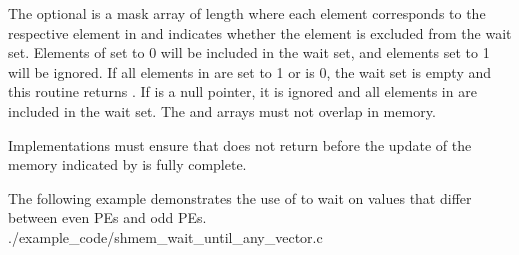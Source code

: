 \begin{apidefinition}
{    The optional  is a mask array of length  where each
    element corresponds to the respective element in  and indicates
    whether the element is excluded from the wait set.  Elements of
     set to 0 will be included in the wait set, and elements set to
    1 will be ignored.  If all elements in  are set to 1 or
     is 0, the wait set is empty and this routine returns
    .  If  is a null pointer, it is ignored and
    all elements in  are included in the wait set.  The 
    and  arrays must not overlap in memory.

    Implementations must ensure that 
    does not return before the update of the memory indicated by  is
    fully complete.
}



\begin{apiexamples}
  \apicexample
      {The following \Cstd[11] example demonstrates the use of
       to wait on values that differ
      between even PEs and odd PEs.}
      {./example_code/shmem_wait_until_any_vector.c}
      {}
\end{apiexamples}

\end{apidefinition}

